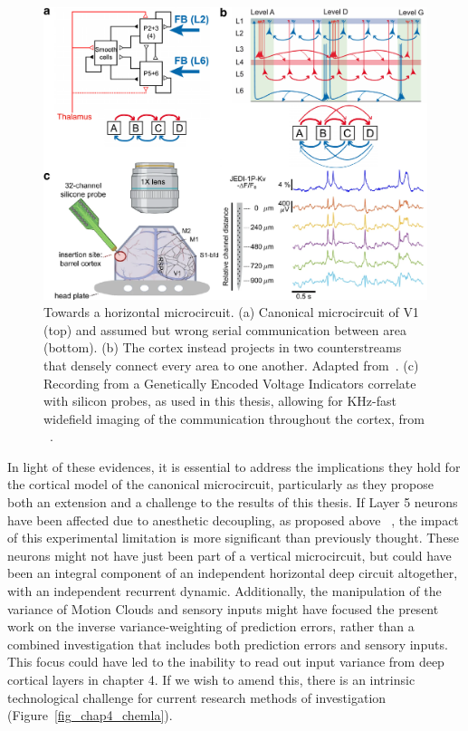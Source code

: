 \begin{figure}[h!tbp]
\vspace{0.1cm}
\centering
\includegraphics[width=1.\textwidth]{fig/fig_chap8_lateral.pdf}
\caption[Towards a horizontal microcircuit.]{Towards a horizontal microcircuit. (a) Canonical microcircuit of \gls{V1}~\cite{martin1994brief} (top) and assumed but wrong serial communication between area (bottom). (b) The cortex instead projects in two counterstreams that densely connect every area to one another. Adapted from~\cite{markov2014anatomy}. (c) Recording from a Genetically Encoded Voltage Indicators correlate with silicon probes, as used in this thesis, allowing for KHz-fast widefield imaging of the communication throughout the cortex, from ~\cite{lu2023widefield}.}
\label{fig_chap8_lateral}
\end{figure} %

In light of these evidences, it is essential to address the implications they hold for the cortical model of the canonical microcircuit, particularly as they propose both an extension and a challenge to the results of this thesis. If Layer 5 neurons have been affected due to anesthetic decoupling, as proposed above ~\cite{suzuki2020general}, the impact of this experimental limitation is more significant than previously thought. These neurons might not have just been part of a vertical microcircuit, but could have been an integral component of an independent horizontal deep circuit altogether, with an independent recurrent dynamic. Additionally, the manipulation of the variance of Motion Clouds and sensory inputs might have focused the present work on the inverse variance-weighting of prediction errors, rather than a combined investigation that includes both prediction errors and sensory inputs. This focus could have led to the inability to read out input variance from deep cortical layers in chapter 4. If we wish to amend this, there is an intrinsic technological challenge for current research methods of investigation (Figure~\ref{fig_chap4_chemla}).


